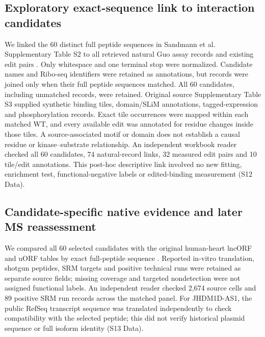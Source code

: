 \documentclass[11pt,a4paper]{article}
\begin{document}
\subsection{Exploratory exact-sequence link to interaction candidates}
We linked the 60 distinct full peptide sequences in Sandmann et al.
Supplementary Table S2 to all retrieved natural Guo assay records and existing
edit pairs \cite{sandmann,guo}. Only whitespace and one terminal stop were
normalized. Candidate names and Ribo-seq identifiers were retained as annotations, but records were joined only when their full peptide sequences matched. All
60 candidates, including unmatched records, were retained. Original source
Supplementary Table S3 supplied synthetic binding tiles, domain/SLiM
annotations, tagged-expression and phosphorylation records. Exact tile
occurrences were mapped within each matched WT, and every available edit
was annotated for residue changes inside those tiles. A source-associated
motif or domain does not establish a causal residue or kinase--substrate
relationship. An independent workbook reader checked all 60 candidates,
74 natural-record links, 32 measured edit pairs and 10 tile/edit annotations.
This post-hoc descriptive link involved no new fitting, enrichment test,
functional-negative labels or edited-binding measurement (S12 Data).

\subsection{Candidate-specific native evidence and later MS reassessment}
We compared all 60 selected candidates with the original human-heart
lncORF and uORF tables by exact full-peptide sequence \cite{vanheesch}.
Reported in-vitro translation, shotgun peptides, SRM targets and positive
technical runs were retained as separate source fields; missing coverage
and targeted nondetection were not assigned functional labels. An independent
reader checked 2,674 source cells and 89 positive SRM run records across
the matched panel. For JHDM1D-AS1, the public RefSeq transcript sequence was
translated independently to check compatibility with the selected peptide;
this did not verify historical plasmid sequence or full isoform identity
(S13 Data).
\end{document}
